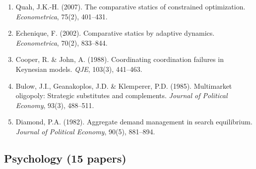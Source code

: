 \begin{enumerate}
    \item Quah, J.K.-H. (2007). The comparative statics of constrained optimization. \textit{Econometrica}, 75(2), 401--431.
    \item Echenique, F. (2002). Comparative statics by adaptive dynamics. \textit{Econometrica}, 70(2), 833--844.
    \item Cooper, R. \& John, A. (1988). Coordinating coordination failures in Keynesian models. \textit{QJE}, 103(3), 441--463.
    \item Bulow, J.I., Geanakoplos, J.D. \& Klemperer, P.D. (1985). Multimarket oligopoly: Strategic substitutes and complements. \textit{Journal of Political Economy}, 93(3), 488--511.
    \item Diamond, P.A. (1982). Aggregate demand management in search equilibrium. \textit{Journal of Political Economy}, 90(5), 881--894.
\end{enumerate}

\subsection{Psychology (15 papers)}

